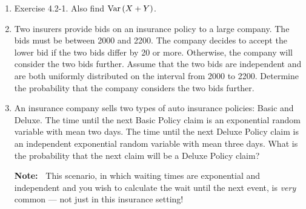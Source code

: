 \documentclass{article}
\def\Var{\mathop{\rm Var\,}\nolimits}
\begin{document}
\begin{enumerate}
\item Exercise 4.2-1.  Also find $\Var (X+Y)$.

\item 
Two insurers provide bids on an insurance policy to a large company. The bids must be
between 2000 and 2200. The company decides to accept the lower bid if the two bids
differ by 20 or more. Otherwise, the company will consider the two bids further.
Assume that the two bids are independent and are both uniformly distributed on the
interval from 2000 to 2200.
Determine the probability that the company considers the two bids further.

\item 
An insurance company sells two types of auto insurance policies: Basic and Deluxe. The
time until the next Basic Policy claim is an exponential random variable with mean two
days. The time until the next Deluxe Policy claim is an independent exponential random
variable with mean three days.
What is the probability that the next claim will be a Deluxe Policy claim?

{\bf Note:\ }  This scenario, in which waiting times are exponential and independent and you
wish to calculate the wait until the next event, is {\em very} common --- not just in this
insurance setting!

\end{enumerate}
\end{document}
